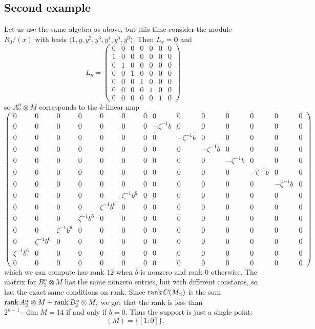 \documentclass [11pt, proquest] {uwthesis}[2020/02/24]
\DeclareMathOperator{\suppr}{supp^\mathit{rnk}}
\begin{document}
\subsection{Second example}
    Let us use the same algebra as above, but this time consider the module $R_0/(x)$ with basis $\langle 1,y,y^2,y^3,y^4,y^5,y^6\rangle.$ Then $L_x=\mathbf 0$ and 
    \[L_y=\begin{pmatrix}
        0 & 0 & 0 & 0 & 0 & 0 & 0\\
        1 & 0 & 0 & 0 & 0 & 0 & 0\\
        0 & 1 & 0 & 0 & 0 & 0 & 0\\
        0 & 0 & 1 & 0 & 0 & 0 & 0\\
        0 & 0 & 0 & 1 & 0 & 0 & 0\\
        0 & 0 & 0 & 0 & 1 & 0 & 0\\
        0 & 0 & 0 & 0 & 0 & 1 & 0
    \end{pmatrix}\]
    so $A_2^\alpha\otimes M$ corresponds to the $k$-linear map
    \[\left(\begin{smallmatrix}
        0 & 0 & 0 & 0 & 0 & 0 & 0 & 0 & 0 & 0 & 0 & 0 & 0 & 0\\
        0 & 0 & 0 & 0 & 0 & 0 & 0 & -\zeta^{-1}b & 0 & 0 & 0 & 0 & 0 & 0\\
        0 & 0 & 0 & 0 & 0 & 0 & 0 & 0 & -\zeta^{-1}b & 0 & 0 & 0 & 0 & 0\\
        0 & 0 & 0 & 0 & 0 & 0 & 0 & 0 & 0 & -\zeta^{-1}b & 0 & 0 & 0 & 0\\
        0 & 0 & 0 & 0 & 0 & 0 & 0 & 0 & 0 & 0 & -\zeta^{-1}b & 0 & 0 & 0\\
        0 & 0 & 0 & 0 & 0 & 0 & 0 & 0 & 0 & 0 & 0 & -\zeta^{-1}b & 0 & 0\\
        0 & 0 & 0 & 0 & 0 & 0 & 0 & 0 & 0 & 0 & 0 & 0 & -\zeta^{-1}b & 0\\
        0 & 0 & 0 & 0 & 0 & \zeta^{-1} b^6 & 0 & 0 & 0 & 0 & 0 & 0 & 0 & 0\\
        0 & 0 & 0 & 0 & \zeta^{-1} b^6 & 0 & 0 & 0 & 0 & 0 & 0 & 0 & 0 & 0\\
        0 & 0 & 0 & \zeta^{-1} b^6 & 0 & 0 & 0 & 0 & 0 & 0 & 0 & 0 & 0 & 0\\
        0 & 0 & \zeta^{-1} b^6 & 0 & 0 & 0 & 0 & 0 & 0 & 0 & 0 & 0 & 0 & 0\\
        0 & \zeta^{-1} b^6 & 0 & 0 & 0 & 0 & 0 & 0 & 0 & 0 & 0 & 0 & 0 & 0\\
        \zeta^{-1} b^6 & 0 & 0 & 0 & 0 & 0 & 0 & 0 & 0 & 0 & 0 & 0 & 0 & 0\\
        0 & 0 & 0 & 0 & 0 & 0 & 0 & 0 & 0 & 0 & 0 & 0 & 0 & 0
    \end{smallmatrix}\right)\]
    which we can compute has rank $12$ when $b$ is nonzero and rank 0 otherwise. The matrix for $B_2^\alpha\otimes M$ has the same nonzero entries, but with different constants, so has the exact same conditions on rank. Since $\operatorname{rank} C(M_\alpha)$ is the sum $\operatorname{rank} A_2^\alpha\otimes M+\operatorname{rank} B_2^\alpha\otimes M,$ we get that the rank is less than $2^{n-1}\cdot \dim M=14$ if and only if $b=0.$ Thus the support is just a single point:
    \[\suppr(M)=\{[1:0]\}.\]
\end{document}
